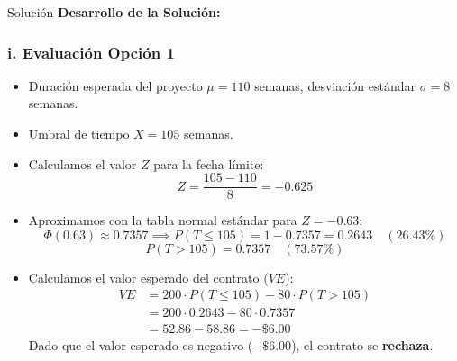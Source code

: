 \documentclass[11pt, a4paper]{article}
\begin{document}
  \medskip
  \begin{ejercicio}{Solución}
  \textbf{Desarrollo de la Solución:}

  \subsubsection*{i. Evaluación Opción 1}
  \begin{itemize}
    \item Duración esperada del proyecto $\mu = 110$ semanas, desviación estándar $\sigma = 8$ semanas.
    \item Umbral de tiempo $X = 105$ semanas.
    \item Calculamos el valor $Z$ para la fecha límite:
      \begin{equation*}
        Z = \frac{105 - 110}{8} = -0.625
      \end{equation*}
    \item Aproximamos con la tabla normal estándar para $Z = -0.63$:
      \begin{equation*}
        \Phi(0.63) \approx 0.7357 \implies P(T \le 105) = 1 - 0.7357 = 0.2643 \quad (26.43\%)
      \end{equation*}
      \begin{equation*}
        P(T > 105) = 0.7357 \quad (73.57\%)
      \end{equation*}
    \item Calculamos el valor esperado del contrato ($VE$):
      \begin{equation*}
      \begin{aligned}
        VE &= 200 \cdot P(T \le 105) - 80 \cdot P(T > 105) \\
           &= 200 \cdot 0.2643 - 80 \cdot 0.7357 \\
           &= 52.86 - 58.86 = -\$6.00
      \end{aligned}
      \end{equation*}
      Dado que el valor esperado es negativo ($-\$6.00$), el contrato se \textbf{rechaza}.
  \end{itemize}


\end{ejercicio}
\end{document}
